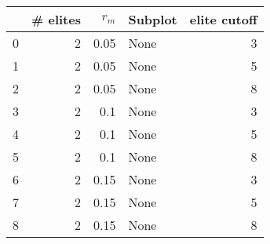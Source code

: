 \begin{tabular}{lrrlr}
\hline
{} &                                 # elites &                                    $r_m$ &                                  Subplot &                             elite cutoff \\
\midrule
0                                        &                                        2 &                                     0.05 &                                     None &                                        3 \\
1                                        &                                        2 &                                     0.05 &                                     None &                                        5 \\
2                                        &                                        2 &                                     0.05 &                                     None &                                        8 \\
3                                        &                                        2 &                                      0.1 &                                     None &                                        3 \\
4                                        &                                        2 &                                      0.1 &                                     None &                                        5 \\
5                                        &                                        2 &                                      0.1 &                                     None &                                        8 \\
6                                        &                                        2 &                                     0.15 &                                     None &                                        3 \\
7                                        &                                        2 &                                     0.15 &                                     None &                                        5 \\
8                                        &                                        2 &                                     0.15 &                                     None &                                        8 \\

\end{tabular}
